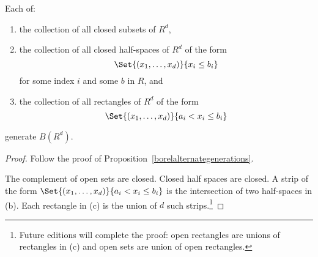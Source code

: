 \begin{proposition}
Each of:
  \begin{enumerate}
    \item the collection of all closed subsets of $R^d$,
    \item the collection of all closed half-spaces of $R^d$ of the form
      \[
\Set{(x_1, \dots , x_d)}{x_i \leq b_i}
      \]
for some index $i$ and some $b$ in $R$, and
    \item the collection of all rectangles of $R^d$ of the form
      \[
\Set{(x_1, \dots , x_d)}{a_i < x_i \leq b_i}
      \]
  \end{enumerate}
generate $B(R^d)$.\end{proposition}
\begin{proof}Follow the proof of Proposition~\ref{borelalternategenerations}.

The complement of open sets are closed.
Closed half spaces are closed.
A strip of the form $\Set{(x_1, \dots , x_d)}{a_i < x_i \leq b_i}$ is the intersection of two half-spaces in (b).
Each rectangle in (c) is the union of $d$ such strips.\footnote{Future editions will complete the proof:
open rectangles are unions of
rectangles in (c) and
open sets are union of open rectangles.}
\end{proof}